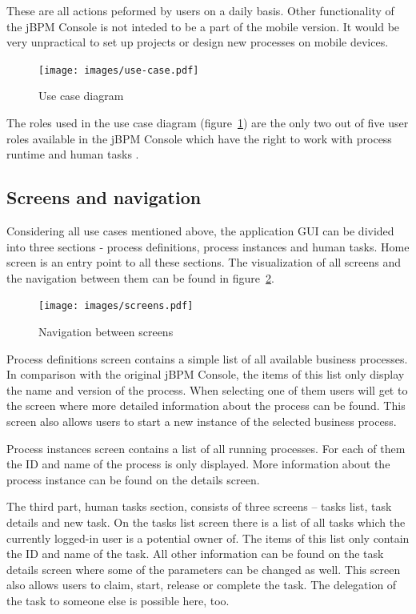 \documentclass[12pt,oneside,final]{fithesis2}
\begin{document}
These are all actions peformed by users on a daily basis.
Other functionality of the jBPM Console is not inteded to be a part of the mobile version.
It would be very unpractical to set up projects or design new processes on mobile devices.

\begin{figure}[ht!]
\centering
\texttt{[image: images/use-case.pdf]}
\caption{Use case diagram}
\label{fig:use-case}
\end{figure}

The roles used in the use case diagram (figure~\ref{fig:use-case}) are the only two out of five user roles available in the jBPM Console which have the right to work with process runtime and human tasks \cite{jbpm6roles}.

\subsection{Screens and navigation}
Considering all use cases mentioned above, the application GUI can be divided into three sections - process definitions, process instances and human tasks.
Home screen is an entry point to all these sections.
The visualization of all screens and the navigation between them can be found in figure~\ref{fig:screens}.

\begin{figure}[ht!]
\centering
\texttt{[image: images/screens.pdf]}
\caption{Navigation between screens}
\label{fig:screens}
\end{figure}

Process definitions screen contains a simple list of all available business processes.
In comparison with the original jBPM Console, the items of this list only display the name and version of the process.
When selecting one of them users will get to the screen where more detailed information about the process can be found.
This screen also allows users to start a new instance of the selected business process.

Process instances screen contains a list of all running processes.
For each of them the ID and name of the process is only displayed.
More information about the process instance can be found on the details screen.

The third part, human tasks section, consists of three screens -- tasks list, task details and new task.
On the tasks list screen there is a list of all tasks which the currently logged-in user is a potential owner of\footnotemark{}.
The items of this list only contain the ID and name of the task.
All other information can be found on the task details screen where some of the parameters can be changed as well.
This screen also allows users to claim, start, release or complete the task.
The delegation of the task to someone else is possible here, too.
\end{document}
